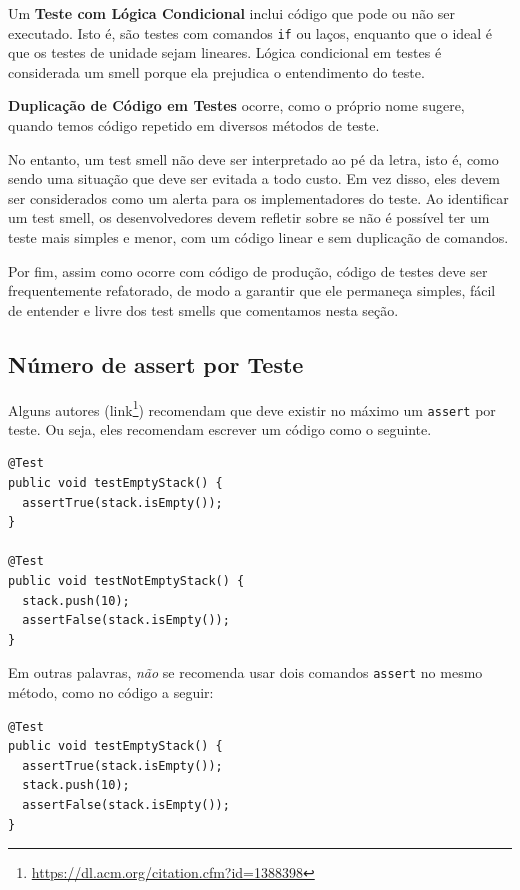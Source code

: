 \documentclass[
  11pt,
  twoside]{book}
\newcommand{\passthrough}[1]{#1}
\DeclareRobustCommand{\href}[2]{#2\footnote{\url{#1}}}
\begin{document}
Um \textbf{Teste com Lógica Condicional} inclui código que pode ou não
ser executado. Isto é, são testes com comandos
\passthrough{\lstinline!if!} ou laços, enquanto que o ideal é que os
testes de unidade sejam lineares. Lógica condicional em testes é
considerada um smell porque ela prejudica o entendimento do teste.

\textbf{Duplicação de Código em Testes} ocorre, como o próprio nome
sugere, quando temos código repetido em diversos métodos de teste.

No entanto, um test smell não deve ser interpretado ao pé da letra, isto
é, como sendo uma situação que deve ser evitada a todo custo. Em vez
disso, eles devem ser considerados como um alerta para os
implementadores do teste. Ao identificar um test smell, os
desenvolvedores devem refletir sobre se não é possível ter um teste mais
simples e menor, com um código linear e sem duplicação de comandos.

Por fim, assim como ocorre com código de produção, código de testes deve
ser frequentemente refatorado, de modo a garantir que ele permaneça
simples, fácil de entender e livre dos test smells que comentamos nesta
seção.

\hypertarget{nuxfamero-de-assert-por-teste}{%
\subsection{Número de assert por
Teste}\label{nuxfamero-de-assert-por-teste}}


Alguns autores (\href{https://dl.acm.org/citation.cfm?id=1388398}{link})
recomendam que deve existir no máximo um
\passthrough{\lstinline!assert!} por teste. Ou seja, eles recomendam
escrever um código como o seguinte.

\begin{lstlisting}
@Test
public void testEmptyStack() {
  assertTrue(stack.isEmpty());
}

@Test
public void testNotEmptyStack() {
  stack.push(10);
  assertFalse(stack.isEmpty());
}
\end{lstlisting}

Em outras palavras, \emph{não} se recomenda usar dois comandos
\passthrough{\lstinline!assert!} no mesmo método, como no código a
seguir:

\begin{lstlisting}
@Test
public void testEmptyStack() {
  assertTrue(stack.isEmpty());
  stack.push(10);
  assertFalse(stack.isEmpty());
}
\end{lstlisting}
\end{document}
